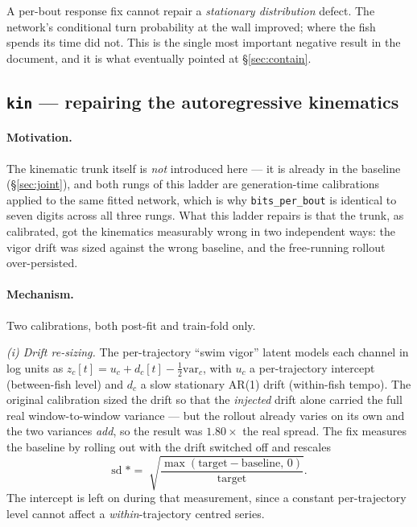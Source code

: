 \documentclass[11pt,a4paper]{article}
\newcommand{\code}[1]{\texttt{\small #1}}
\begin{document}
\begin{takeaway}
A per-bout response fix cannot repair a \emph{stationary distribution} defect. The
network's conditional turn probability at the wall improved; where the fish spends its
time did not. This is the single most important negative result in the document, and it
is what eventually pointed at \S\ref{sec:contain}.
\end{takeaway}

\subsection{\texttt{kin} --- repairing the autoregressive kinematics}\label{sec:kin}

\paragraph{Motivation.}
The kinematic trunk itself is \emph{not} introduced here --- it is already in the baseline
(\S\ref{sec:joint}), and both rungs of this ladder are generation-time calibrations applied
to the same fitted network, which is why \code{bits\_per\_bout} is identical to seven
digits across all three rungs. What this ladder repairs is that the trunk, as calibrated,
got the kinematics measurably wrong in two independent ways: the vigor drift was sized
against the wrong baseline, and the free-running rollout over-persisted.

\paragraph{Mechanism.} Two calibrations, both post-fit and train-fold only.

\emph{(i) Drift re-sizing.} The per-trajectory ``swim vigor'' latent models each channel
in log units as $z_c[t] = u_c + d_c[t] - \tfrac12\mathrm{var}_c$, with $u_c$ a
per-trajectory intercept (between-fish level) and $d_c$ a slow stationary AR(1) drift
(within-fish tempo). The original calibration sized the drift so that the \emph{injected}
drift alone carried the full real window-to-window variance --- but the rollout already
varies on its own and the two variances \emph{add}, so the result was
$1.80\times$ the real spread. The fix measures the baseline by rolling out with the
drift switched off and rescales
\begin{equation}\label{eq:driftfix}
\mathrm{sd} \;\mathrel{{*}{=}}\; \sqrt{\frac{\max(\text{target}-\text{baseline},\,0)}{\text{target}}} .
\end{equation}
The intercept is left on during that measurement, since a constant per-trajectory level
cannot affect a \emph{within}-trajectory centred series.
\end{document}
